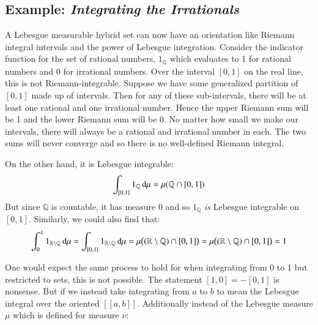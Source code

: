 





\subsection{Example: \emph{Integrating the Irrationals}}

A Lebesgue measurable hybrid set can now have an orientation like Riemann integral intervals 
and the power of Lebesgue integration.
Consider the indicator function for the set of rational numbers, $1_\mathbb{Q}$ which evaluates to 
1 for rational numbers and 0 for irrational numbers.
Over the interval $[0,1]$ on the real line, this is not Riemann-integrable.
Suppose we have some generalized partition of $[0,1]$ made up of intervals.
Then for any of these sub-intervals, there will be at least one rational and one irrational number.
Hence the upper Riemann sum will be 1 and the lower Riemann sum will be 0.
No matter how small we make our intervals, there will always be a rational and irrational number in each.
The two sums will never converge and so there is no well-defined Riemann integral.


On the other hand, it is Lebesgue integrable:
\begin{equation}
	\int_{[0,1]} 1_\mathbb{Q} \mathop{}\!\mathrm{d}\mu = \mu(\mathbb{Q} \cap [0,1])
\end{equation}
But since $\mathbb{Q}$ is countable, it has measure 0 and so $1_\mathbb{Q}$ \emph{is} Lebesgue integrable on $[0,1]$.
Similarly, we could also find that:
\begin{equation}
	\int_0^1 1_{\mathbb{R}\setminus \mathbb{Q}} \mathop{}\!\mathrm{d} \mu
		= \int_{[0,1]} 1_{\mathbb{R}\setminus \mathbb{Q}} \mathop{}\!\mathrm{d} \mu
		= \mu \big( (\mathbb{R}\setminus\mathbb{Q}) \cap [0,1] \big)
		= \mu \big( (\mathbb{R}\setminus\mathbb{Q}) \cap [0,1] \big)
		= 1
\end{equation}

One would expect the same process to hold for when integrating from 0 to 1 but restricted to sets, this is not possible.
The statement $[1,0] = -[0,1]$ is nonsense.
But if we instead take integrating from $a$ to $b$ to mean the Lebesgue integral over the oriented $[\![a,b]\!]$.
Additionally instead of the Lebesgue measure $\mu$ which is defined for 
measure $\nu$:


